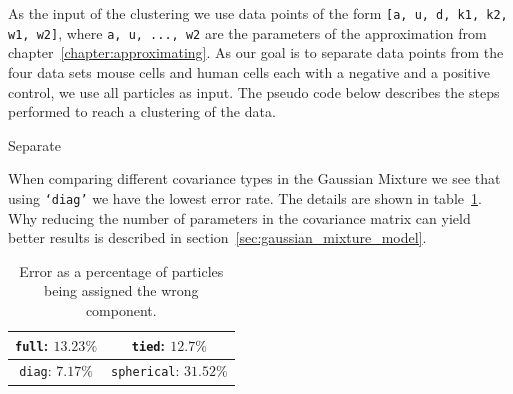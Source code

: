 As the input of the clustering we use data points of the form \texttt{[a, u, d, k1, k2, w1, w2]}, where \texttt{a, u, ..., w2} are the parameters of the approximation from chapter~\ref{chapter:approximating}. As our goal is to separate data points from the four data sets mouse cells and human cells each with a negative and a positive control, we use all particles as input. The pseudo code below describes the steps performed to reach a clustering of the data.

\begin{algorithm}[H] \label{alg:separate}
	\SetAlgoLined
	\DontPrintSemicolon
	\LinesNumbered
	\caption{Separate}
	
	
	\BlankLine
\end{algorithm}
\vspace{1cm}

When comparing different covariance types in the Gaussian Mixture we see that using \texttt{‘diag’} we have the lowest error rate. The details are shown in table~\ref{tab:covariance_type_comparison}. Why reducing the number of parameters in the covariance matrix can yield better results is described in section~\ref{sec:gaussian_mixture_model}.

\begin{table}[h!]
	\centering
	\begin{tabular}{|c|c|}
		\hline
		\texttt{full}: $13.23\%$ & \texttt{tied}: $12.7\%$ \\
		\hline
		\texttt{diag}: $7.17\%$ & \texttt{spherical}: $31.52\%$ \\
		\hline
	\end{tabular}
	\caption{Error as a percentage of particles being assigned the wrong component.}
	\label{tab:covariance_type_comparison}
\end{table}

